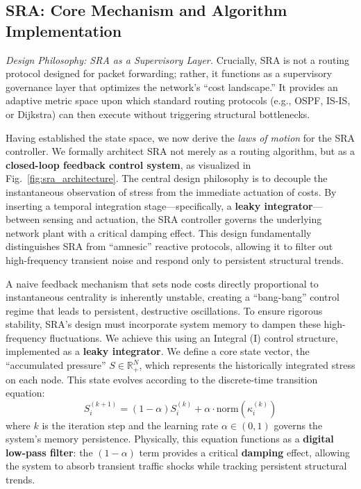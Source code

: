 \documentclass{ccjnl}
\begin{document}
\subsection{SRA: Core Mechanism and Algorithm Implementation}
\label{subsec:sra_mechanism}

\textit{Design Philosophy: SRA as a Supervisory Layer.} 
Crucially, SRA is not a routing protocol designed for packet forwarding; rather, it functions as a supervisory governance layer that optimizes the network's ``cost landscape.'' It provides an adaptive metric space upon which standard routing protocols (e.g., OSPF, IS-IS, or Dijkstra) can then execute without triggering structural bottlenecks.

Having established the state space, we now derive the \textit{laws of motion} for the SRA controller. 
We formally architect SRA not merely as a routing algorithm, but as a \textbf{closed-loop feedback control system}, as visualized in Fig.~\ref{fig:sra_architecture}. 
The central design philosophy is to decouple the instantaneous observation of stress from the immediate actuation of costs. 
By inserting a temporal integration stage---specifically, a \textbf{leaky integrator}---between sensing and actuation, the SRA controller governs the underlying network plant with a critical damping effect. 
This design fundamentally distinguishes SRA from ``amnesic'' reactive protocols, allowing it to filter out high-frequency transient noise and respond only to persistent structural trends.



A naive feedback mechanism that sets node costs directly proportional to instantaneous centrality is inherently unstable, creating a ``bang-bang'' control regime that leads to persistent, destructive oscillations. 
To ensure rigorous stability, SRA's design must incorporate system memory to dampen these high-frequency fluctuations. 
We achieve this using an Integral (I) control structure, implemented as a \textbf{leaky integrator}. 
We define a core state vector, the ``accumulated pressure'' $S \in \mathbb{R}^N_+$, which represents the historically integrated stress on each node. 
This state evolves according to the discrete-time transition equation:
\begin{equation}
    \label{eq:pressure_update}
    S_i^{(k+1)} = (1 - \alpha) S_i^{(k)} + \alpha \cdot \mathrm{norm}(\kappa_i^{(k)})
\end{equation}
where $k$ is the iteration step and the learning rate $\alpha \in (0,1)$ governs the system's memory persistence. 
Physically, this equation functions as a \textbf{digital low-pass filter}: the $(1-\alpha)$ term provides a critical \textbf{damping} effect, allowing the system to absorb transient traffic shocks while tracking persistent structural trends.
\end{document}
